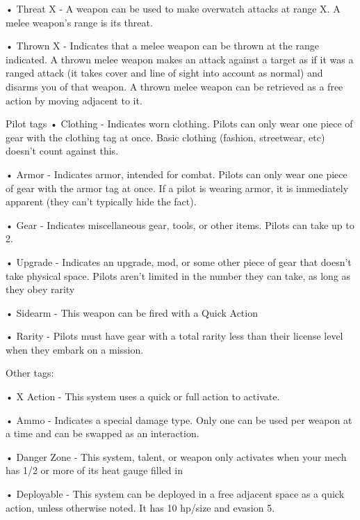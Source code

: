 •  \hypertarget{Threat}{Threat X} - A weapon can be used to make overwatch attacks at range X. A melee weapon's
  range is its threat.

•  \hypertarget{Thrown}{Thrown X} - Indicates that a melee weapon can be thrown at the range indicated. A thrown
  melee weapon makes an attack against a target as if it was a ranged attack (it takes cover and
  line of sight into account as normal) and disarms you of that weapon. A thrown melee weapon
  can be retrieved as a free action by moving adjacent to it.


Pilot tags
•  \hypertarget{Clothing}{Clothing} - Indicates worn clothing. Pilots can only wear one piece of gear with the clothing tag
  at once. Basic clothing (fashion, streetwear, etc) doesn't count against this.

•  \hypertarget{Armor}{Armor} - Indicates armor, intended for combat. Pilots can only wear one piece of gear with the
  armor tag at once. If a pilot is wearing armor, it is immediately apparent (they can't typically
  hide the fact).

•  \hypertarget{Gear}{Gear} - Indicates miscellaneous gear, tools, or other items. Pilots can take up to 2.

•  \hypertarget{Upgrade}{Upgrade} - Indicates an upgrade, mod, or some other piece of gear that doesn't take physical
  space. Pilots aren't limited in the number they can take, as long as they obey rarity

•  \hypertarget{Sidearm}{Sidearm} - This weapon can be fired with a Quick Action

•  \hypertarget{Rarity}{Rarity} - Pilots must have gear with a total rarity less than their license level when they embark
  on a mission.

Other tags:

•  \hypertarget{Action}{X Action} - This system uses a quick or full action to activate.





•  \hypertarget{Ammo}{Ammo} - Indicates a special damage type. Only one can be used per weapon at a time and can
  be swapped as an interaction.

•  \hypertarget{Danger Zone}{Danger Zone} - This system, talent, or weapon only activates when your mech has 1/2 or more
  of its heat gauge filled in

•  Deployable - This system can be deployed in a free adjacent space as a quick action, unless
  otherwise noted. It has 10 hp/size and evasion 5.

